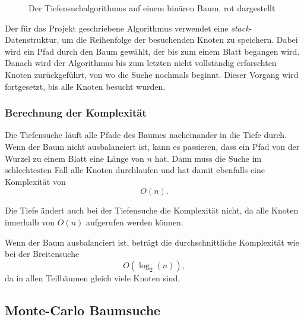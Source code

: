 \documentclass[a4paper,11pt]{article}
\begin{document}
\begin{figure}[htbp]
\centering
{}
\caption{Der Tiefensuchalgorithmus auf einem binären Baum, rot dargestellt}
\label{fig:binary_tree_dfs}
\end{figure}

Der für das Projekt geschriebene Algorithmus verwendet eine \emph{stack}-Datenstruktur, um die Reihenfolge der besuchenden Knoten zu speichern. Dabei wird ein Pfad durch den Baum gewählt, der bis zum einem Blatt begangen wird. Danach wird der Algorithmus bis zum letzten nicht vollständig erforschten Knoten zurückgeführt, von wo die Suche nochmals beginnt. Dieser Vorgang wird fortgesetzt, bis alle Knoten besucht wurden.

\subsubsection{Berechnung der Komplexität}

Die Tiefensuche läuft alle Pfade des Baumes nacheinander in die Tiefe durch. Wenn der Baum nicht ausbalanciert ist, kann es passieren, dass ein Pfad von der Wurzel zu einem Blatt eine Länge von $n$ hat. Dann muss die Suche im schlechtesten Fall alle Knoten durchlaufen und hat damit ebenfalls eine Komplexität von $$O(n).$$

Die Tiefe ändert auch bei der Tiefensuche die Komplexität nicht, da alle Knoten innerhalb von $O(n)$ aufgerufen werden können.

Wenn der Baum ausbalanciert ist, beträgt die durchschnittliche Komplexität wie bei der Breitensuche $$O(\log_2(n)),$$ da in allen Teilbäumen gleich viele Knoten sind.

\subsection{Monte-Carlo Baumsuche}
\end{document}
